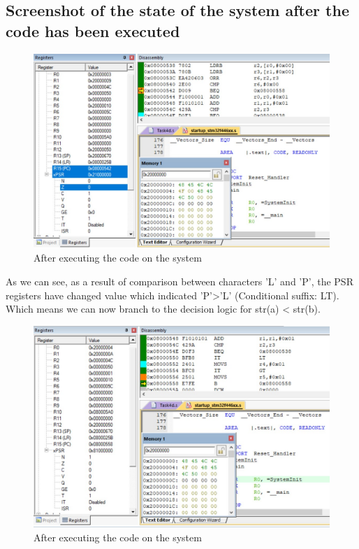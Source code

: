 \documentclass[footheight=20pt, footsepline, headheight=20pt, headsepline]{scrartcl}
\begin{document}
\subsection*{Screenshot of the state of the system after the code has been executed}
\begin{figure}[h!]
    \centering
    \includegraphics[scale=.7]{images/Task4d_After1.jpg}
    \caption{After executing the code on the system}
    \label{fig:after_task_4d1}
\end{figure}
\FloatBarrier
As we can see, as a result of comparison between characters 'L' and 'P', the PSR registers have changed value which indicated 'P'>'L' (Conditional suffix: LT). Which means we can now branch to the decision logic for str(a) < str(b).
\begin{figure}[h!]
    \centering
    \includegraphics[scale=.7]{images/Task4d_After2.jpg}
    \caption{After executing the code on the system}
    \label{fig:after_task_4d2}
\end{figure}
\end{document}
